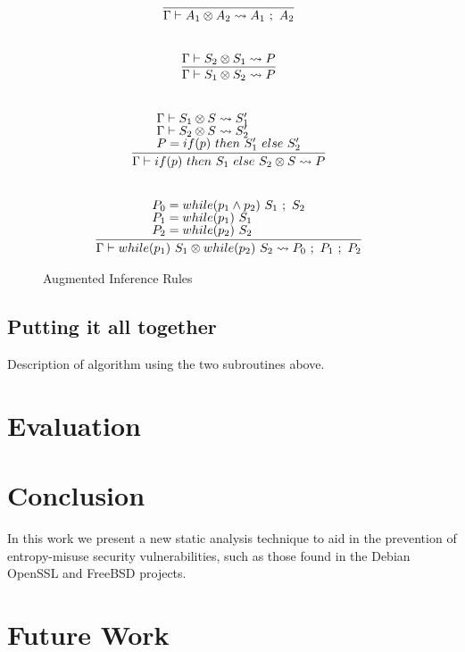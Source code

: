 \documentclass[letterpaper,twocolumn,10pt]{article}
\newcommand{\cross}{\otimes{}}
\begin{document}
\begin{figure}
    \label{fig:auginfrules2}
    \caption{Augmented Inference Rules}
    \[
		\begin{array}{c}
			\infer[]{\Gamma \vdash A_1 \cross A_2 \leadsto A_1\ ;\ A_2}{} \\ \\ \\
			\infer[]{\Gamma \vdash S_1 \cross S_2 \leadsto P}{
				\Gamma \vdash S_2 \cross S_1 \leadsto P
			} \\ \\ \\
			\infer[]{\Gamma \vdash if(p)\ then\ S_1\ else\ S_2 \cross S \leadsto P}{
				\text{$\Gamma \vdash S_1 \cross S \leadsto S_1'$} \\
				\text{$\Gamma \vdash S_2 \cross S \leadsto S_2'$} \\
				\text{$P = if(p)\ then\ S_1'\ else\ S_2'$}
			} \\ \\ \\
			\infer[]{\Gamma \vdash while(p_1)\ S_1 \cross while(p_2)\ S_2 \leadsto P_0\ ;\ P_1\ ;\ P_2}{
				\text{$P_0 = while(p_1 \land p_2)\ S_1\ ;\ S_2$} \\
				\text{$P_1 = while(p_1)\ S_1$} \\
				\text{$P_2 = while(p_2)\ S_2$}
			}
		\end{array}
    \]
\end{figure}

\subsection{Putting it all together}

Description of algorithm using the two subroutines above.

\section{Evaluation}

\section{Conclusion}

In this work we present a new static analysis technique to aid in the prevention of entropy-misuse security vulnerabilities, such as those
found in the Debian OpenSSL and FreeBSD projects.

\section{Future Work}
\end{document}
